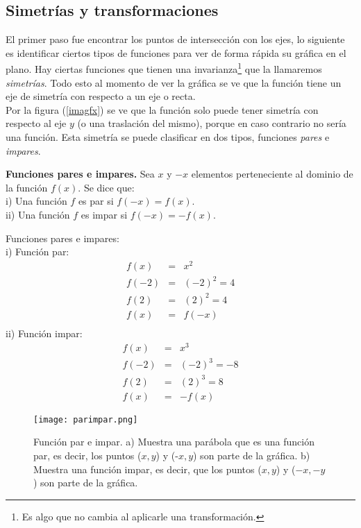 \subsection{Simetrías y transformaciones }
El primer paso fue encontrar los puntos de intersección con los ejes, lo siguiente es identificar ciertos tipos de funciones para ver de forma rápida su gráfica en el plano. Hay ciertas funciones que tienen una invarianza\footnote{Es algo que no cambia al aplicarle una transformación.} que la llamaremos \textit{simetrías}. Todo esto al momento de ver la gráfica se ve que la función tiene un eje de simetría con respecto a un eje o recta.\\
Por la figura (\ref{imagfx}) se ve que la función solo puede tener simetría con respecto al eje $y$ (o una traslación del mismo), porque en caso contrario no sería una función. Esta simetría se puede clasificar en dos tipos, funciones \textit{pares} e \textit{impares}.
\begin{mydef}
\textbf{Funciones pares e impares.} Sea $x$ y $-x$ elementos perteneciente al dominio de la función $f(x)$. Se dice que:\\
\noindent i) Una función $f$ es par si $f(-x)=f(x)$.\\
\noindent ii) Una función $f$ es impar si $f(-x)=-f(x)$.\\
\end{mydef}


\begin{myexample}
Funciones pares e impares:\\

\noindent i) Función par:\\
\begin{eqnarray*}
f(x)&=&x^{2}\\
f(-2)&=&(-2)^{2}=4\\
f(2)&=&(2)^{2}=4\\
f(x)&=&f(-x)\\
\end{eqnarray*}
\noindent ii) Función impar:\\
\begin{eqnarray*}
f(x)&=&x^{3}\\
f(-2)&=&(-2)^{3}=-8\\
f(2)&=&(2)^{3}=8\\
f(x)&=&-f(x)
\end{eqnarray*}
\end{myexample}

\begin{center}
\begin{figure}[h!]
\centering
\texttt{[image: parimpar.png]}
\caption[Función par e impar.]{Función par e impar. a) Muestra una parábola que es una función par, es decir, los puntos ($x,y$) y (-$x,y$) son parte de la gráfica. b) Muestra una función impar, es decir, que los puntos ($x,y$) y ($-x,-y$) son parte de la gráfica.}
\label{parimparfx}
\end{figure}
\end{center}

